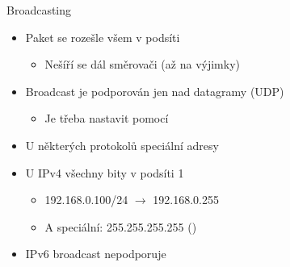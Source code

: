 \begin{frame}{Broadcasting}

  \begin{itemize}
    \item Paket se rozešle všem v podsíti
    \begin{itemize}
      \item Nešíří se dál směrovači (až na výjimky)
    \end{itemize}

    \pause

    \item Broadcast je podporován jen nad datagramy (UDP)
    \begin{itemize}
      \item Je třeba nastavit  pomocí 
    \end{itemize}

    \pause

    \item U některých protokolů speciální adresy

    \pause

    \item U IPv4 všechny bity v podsíti 1
    \begin{itemize}
      \item 192.168.0.100/24 $\rightarrow$ 192.168.0.255
      \item A speciální: 255.255.255.255 ()
    \end{itemize}

    \pause

    \item IPv6 broadcast nepodporuje
  \end{itemize}

\end{frame}


